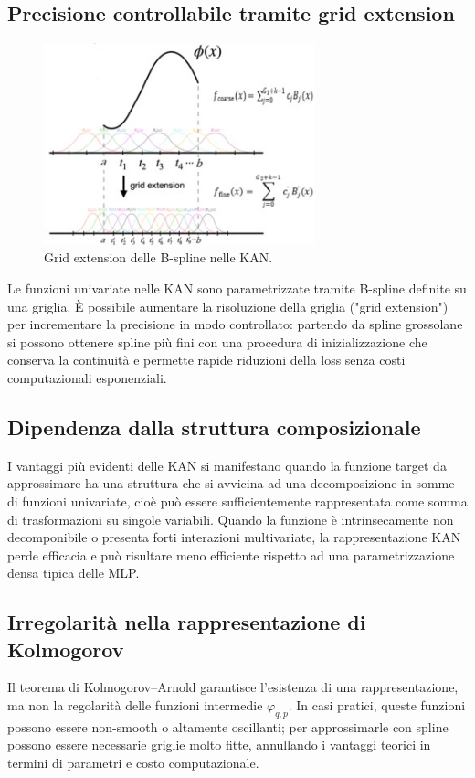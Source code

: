 \documentclass[a4paper,12pt]{report}
\begin{document}
	\subsection{Precisione controllabile tramite grid extension}
	\begin{figure}[H]
		\centering
		\includegraphics[width=0.7\textwidth]{img/grid_extension.jpg}
		\caption{Grid extension delle B-spline nelle KAN.}
	\end{figure}
	Le funzioni univariate nelle KAN sono parametrizzate tramite B-spline definite su una griglia. È possibile aumentare la risoluzione della griglia ("grid extension") per incrementare la precisione in modo controllato: partendo da spline grossolane si possono ottenere spline più fini con una procedura di inizializzazione che conserva la continuità e permette rapide riduzioni della loss senza costi computazionali esponenziali.
	
	\subsection{Dipendenza dalla struttura composizionale}
	I vantaggi più evidenti delle KAN si manifestano quando la funzione target da approssimare ha una struttura che si avvicina ad una decomposizione in somme di funzioni univariate, cioè può essere sufficientemente rappresentata come somma di trasformazioni su singole variabili. Quando la funzione è intrinsecamente non decomponibile o presenta forti interazioni multivariate, la rappresentazione KAN perde efficacia e può risultare meno efficiente rispetto ad una parametrizzazione densa tipica delle MLP.
	
	\subsection{Irregolarità nella rappresentazione di Kolmogorov}
	Il teorema di Kolmogorov–Arnold garantisce l'esistenza di una rappresentazione, ma non la regolarità delle funzioni intermedie \(\varphi_{q,p}\). In casi pratici, queste funzioni possono essere non-smooth o altamente oscillanti; per approssimarle con spline possono essere necessarie griglie molto fitte, annullando i vantaggi teorici in termini di parametri e costo computazionale.
	
\end{document}
